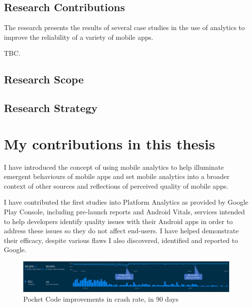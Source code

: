 \subsection{Research Contributions}
The research presents the results of several case studies in the use of analytics to improve the reliability of a variety of mobile apps.

TBC.

\subsection{Research Scope}


\subsection{Research Strategy}


\section{My contributions in this thesis}\label{my-contributions-in-this-thesis}
I have introduced the concept of using mobile analytics to help illuminate emergent behaviours of mobile apps and set mobile analytics into a broader context of other sources and reflections of perceived quality of mobile apps.

I have contributed the first studies into Platform Analytics as provided by Google Play Console, including pre-launch reports and Android Vitals, services intended to help developers identify quality issues with their Android apps in order to address these issues so they do not affect end-users. I have helped demonstrate their efficacy, despite various flaws I also discovered, identified and reported to Google. 

\begin{figure}[ht]
    \centering
    \includegraphics[width=\textwidth]{images/annotated_pocketcode_90_day_fabric_crashlytics_report.jpg}
    \caption{Pocket Code improvements in crash rate, in 90 days}
    \label{fig:pocketcode_improvements_in_crash_rate}
\end{figure}

